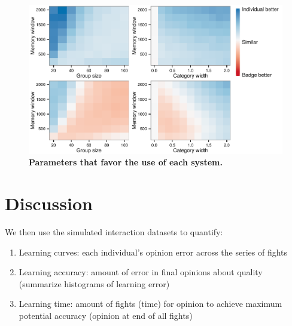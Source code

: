 \begin{figure}
\label{comparison}
\includegraphics[width=6.85in]{figures/cost_comparisons.pdf}
\caption{\sffamily\small\textbf{Parameters that favor the use of each system.}}
\end{figure}

\section*{Discussion}




\newpage






We then use the simulated interaction datasets to quantify: 
\begin{enumerate}
  \item Learning curves: each individual's opinion error across the series of fights 
  \item Learning accuracy: amount of error in final opinions about quality (summarize histograms of learning error)
  \item Learning time: amount of fights (time) for opinion to achieve maximum potential accuracy (opinion at end of all fights)  
\end{enumerate}